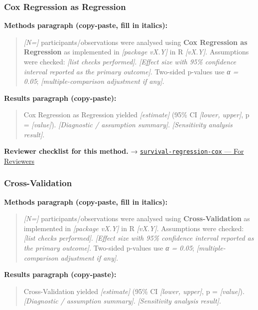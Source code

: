 \documentclass[
]{article}
\begin{document}
\subsubsection{Cox Regression as
Regression}\label{cox-regression-as-regression}

\textbf{Methods paragraph (copy-paste, fill in italics):}

\begin{quote}
\emph{{[}N={]}} participants/observations were analysed using
\textbf{Cox Regression as Regression} as implemented in \emph{{[}package
vX.Y{]}} in R \emph{{[}vX.Y{]}}. Assumptions were checked: \emph{{[}list
checks performed{]}}. \emph{{[}Effect size with 95\% confidence interval
reported as the primary outcome{]}}. Two-sided p-values use \emph{α =
0.05}; \emph{{[}multiple-comparison adjustment if any{]}}.
\end{quote}

\textbf{Results paragraph (copy-paste):}

\begin{quote}
Cox Regression as Regression yielded \emph{{[}estimate{]}} (95\% CI
\emph{{[}lower, upper{]}}, p = \emph{{[}value{]}}). \emph{{[}Diagnostic
/ assumption summary{]}}. \emph{{[}Sensitivity analysis result{]}}.
\end{quote}

\textbf{Reviewer checklist for this method.} →
\href{../chapters/07-regression/survival-regression-cox.Rmd\#for-reviewers}{\texttt{survival-regression-cox}
--- For Reviewers}

\subsubsection{Cross-Validation}\label{cross-validation}

\textbf{Methods paragraph (copy-paste, fill in italics):}

\begin{quote}
\emph{{[}N={]}} participants/observations were analysed using
\textbf{Cross-Validation} as implemented in \emph{{[}package vX.Y{]}} in
R \emph{{[}vX.Y{]}}. Assumptions were checked: \emph{{[}list checks
performed{]}}. \emph{{[}Effect size with 95\% confidence interval
reported as the primary outcome{]}}. Two-sided p-values use \emph{α =
0.05}; \emph{{[}multiple-comparison adjustment if any{]}}.
\end{quote}

\textbf{Results paragraph (copy-paste):}

\begin{quote}
Cross-Validation yielded \emph{{[}estimate{]}} (95\% CI \emph{{[}lower,
upper{]}}, p = \emph{{[}value{]}}). \emph{{[}Diagnostic / assumption
summary{]}}. \emph{{[}Sensitivity analysis result{]}}.
\end{quote}
\end{document}
